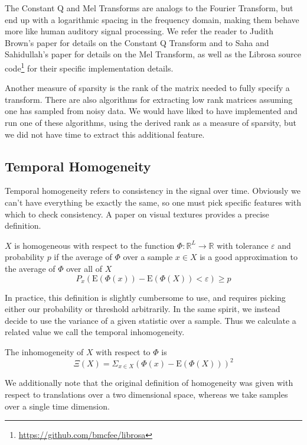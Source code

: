 \documentclass{sig-alternate-05-2015}
\let\realbfseries=\bfseries
\def\bfseries{\realbfseries\boldmath}
\newenvironment{definition}[1][Definition]{\begin{trivlist}
\item[\hskip \labelsep {\bfseries #1}]}{\end{trivlist}}
\let\epsilon=\varepsilon
\begin{document}
The Constant Q and Mel Transforms are analogs to the Fourier Transform, but end up with a logarithmic spacing in the frequency domain, making them behave more like human auditory signal processing. We refer the reader to Judith Brown's paper\cite{brown1991calculation} for details on the Constant Q Transform and to Saha and Sahidullah's paper\cite{Sahidullah2012543} for details on the Mel Transform, as well as the Librosa source code\footnote{\url{https://github.com/bmcfee/librosa}} for their specific implementation details.

Another measure of sparsity is the rank of the matrix needed to fully specify a transform. There are also algorithms for extracting low rank matrices assuming one has sampled from noisy data\cite{negahban2011estimation}. We would have liked to have implemented and run one of these algorithms, using the derived rank as a measure of sparsity, but we did not have time to extract this additional feature.

\subsection{Temporal Homogeneity}
Temporal homogeneity refers to consistency in the signal over time. Obviously we can't have everything be exactly the same, so one must pick specific features with which to check consistency. A paper on visual textures provides a precise definition\cite{portilla2000parametric}.
\begin{definition}
$X$ is homogeneous with respect to the function $\Phi: \mathbb{R}^L \rightarrow \mathbb{R}$ with tolerance $\epsilon$ and probability $p$ if the average of $\Phi$ over a sample $x \in X$ is a good approximation to the average of $\Phi$ over all of $X$ 
$$P_x \left (\mathrm{E} \left(\Phi(x)\right) - \mathrm{E}\left(\Phi(X)\right) < \epsilon \right) \geq p$$
\end{definition}
In practice, this definition is slightly cumbersome to use, and requires picking either our probability or threshold arbitrarily. In the same spirit, we instead decide to use the variance of a given statistic over a sample. Thus we calculate a related value we call the temporal inhomogeneity. 
\begin{definition}
The inhomogeneity of $X$ with respect to $\Phi$ is 
$$\Xi\left(X\right) = \Sigma_{x\in X} \left(\Phi(x) - \mathrm{E}\left(\Phi(X)\right)\right)^2$$
\end{definition}
We additionally note that the original definition of homogeneity was given with respect to translations over a two dimensional space, whereas we take samples over a single time dimension.
\end{document}
